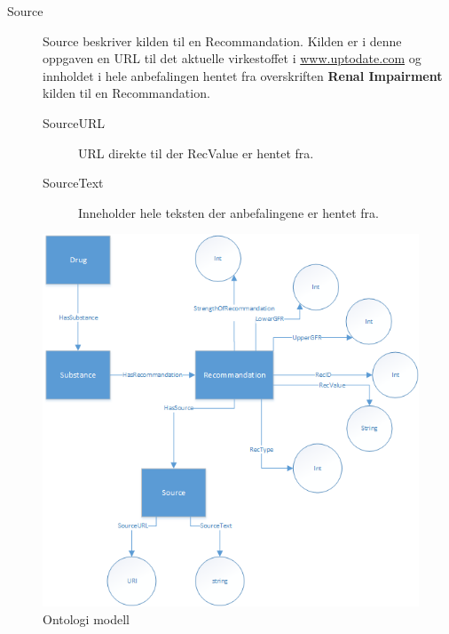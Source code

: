 \begin{description}
\begin{description}
\end{description}

\item[Source]
Source beskriver kilden til en Recommandation. Kilden er i denne oppgaven en URL til det aktuelle virkestoffet i \url{www.uptodate.com} og innholdet i hele anbefalingen hentet fra overskriften \textbf{Renal Impairment} kilden til en Recommandation. 
\begin{description}
\item[SourceURL]
URL direkte til der RecValue er hentet fra.
\item[SourceText]
Inneholder hele teksten der anbefalingene er hentet fra.
\end{description}
\end{description}

\begin{figure}[H]
\begin{center}
\includegraphics[width=12cm]{images/OntologiDiagram}
\caption{Ontologi modell}
\label{fig:ont}
\end{center}
\end{figure}

